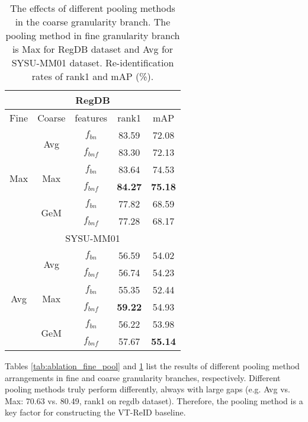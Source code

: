 \documentclass[journal]{IEEEtran}
\begin{document}
\begin{table}
\scriptsize
\caption{The effects of different pooling methods in the coarse granularity branch. The pooling method in fine granularity branch is Max for RegDB dataset and Avg for SYSU-MM01 dataset.  Re-identification rates of rank1 and mAP (\%).}
\label{tab:ablation_coarse_pool}
  \centering
  \setlength{\tabcolsep}{0.5cm}
  \begin{tabular}{c|c|c|c|c}
   \toprule[2pt]
      \multicolumn{5}{c}{RegDB} \\ \hline
    Fine & Coarse & features & rank1 & mAP    \\ \toprule[1pt]
   \multirow{6}{*}{Max} & \multirow{2}{*}{Avg} & $f_{bn}$ & 83.59 & 72.08 \\
                       &  & $f_{bnf}$ & 83.30 & 72.13  \\ \cline{2-5}
    &\multirow{2}{*}{Max} & $f_{bn}$ & 83.64 & 74.53  \\
                        & & $f_{bnf}$ & \textbf{84.27} & \textbf{75.18}  \\ \cline{2-5}
    &\multirow{2}{*}{GeM} & $f_{bn}$ & 77.82 & 68.59  \\
                        & & $f_{bnf}$ & 77.28 & 68.17  \\ \toprule[1pt] \toprule[1pt]
       \multicolumn{5}{c}{SYSU-MM01} \\ \hline
   \multirow{6}{*}{Avg} & \multirow{2}{*}{Avg} & $f_{bn}$ & 56.59 & 54.02 \\
                       &  & $f_{bnf}$ &  56.74 & 54.23 \\ \cline{2-5}
    &\multirow{2}{*}{Max} & $f_{bn}$ & 55.35 & 52.44  \\
                        & & $f_{bnf}$ & \textbf{59.22} &  54.93 \\ \cline{2-5}
    &\multirow{2}{*}{GeM} & $f_{bn}$ & 56.22 & 53.98  \\
                        & & $f_{bnf}$ & 57.67 & \textbf{55.14}  \\
     \toprule[2pt]
  \end{tabular}
\end{table}

Tables \ref{tab:ablation_fine_pool} and \ref{tab:ablation_coarse_pool} list the results of different pooling method arrangements in fine and coarse granularity branches, respectively. Different pooling methods truly perform differently, always with large gaps (e.g. Avg vs. Max: 70.63 vs. 80.49, rank1 on regdb dataset). Therefore, the pooling method is a key factor for constructing the VT-ReID baseline.
\end{document}
